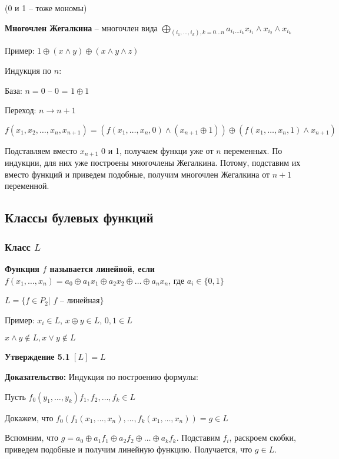 \documentclass[openany]{article}
\begin{document}
   (0 и 1 -- тоже мономы)

   \textbf{Многочлен Жегалкина} -- многочлен вида $\bigoplus\limits_{(i_1,\ldots,i_k), k = 0 \ldots n} a_{i_1\ldots i_k}x_{i_1} \wedge x_{i_2} \wedge x_{i_k}$

   Пример: $1 \oplus (x \wedge y) \oplus (x \wedge y \wedge z)$

   Индукция по $n$:

   База: $n = 0$ -- 0 = $1 \oplus 1$

   Переход: $n \rightarrow n + 1$

   $f(x_1,x_2,\ldots,x_n,x_{n+1}) = (f(x_1,\ldots,x_n,0) \wedge (x_{n+1} \oplus 1)) \oplus (f(x_1, \ldots, x_n, 1) \wedge x_{n+1})$

   Подставляем вместо $x_{n+1}$ 0 и 1, получаем функци уже от $n$ переменных. По индукции, для них уже построены многочлены Жегалкина. Потому, подставим их вместо функций и приведем подобные, получим многочлен Жегалкина от $n + 1$ переменной.

   \subsection{Классы булевых функций}

   \subsubsection{Класс $L$}

   \textbf{Функция $f$ называется линейной, если} $f(x_1,\ldots, x_n) = a_0 \oplus a_1x_1 \oplus a_2x_2 \oplus \ldots \oplus a_nx_n$, где $a_i \in \{0, 1\}$

   $L = \{f \in P_2 |$ $f$ -- линейная$\}$

   Пример: $x_i \in L$, $x \oplus y \in L$, $0, 1 \in L$

   $x \wedge y \notin L, x \vee y \notin L$

   \textbf{Утверждение 5.1} $[L] = L$

   \textbf{Доказательство:} Индукция по построению формулы:

   Пусть $f_0(y_1, \ldots, y_k) f_1, f_2, \ldots, f_k \in L$

   Докажем, что $f_0 (f_1(x_1,\ldots,x_n),\ldots,f_k(x_1,\ldots,x_n)) = g \in L$

   Вспомним, что $g = a_0 \oplus a_1f_1 \oplus a_2f_2 \oplus \ldots \oplus a_kf_k$. Подставим $f_i$, раскроем скобки, приведем подобные и получим линейную функцию. Получается, что $g \in L$.
\end{document}
